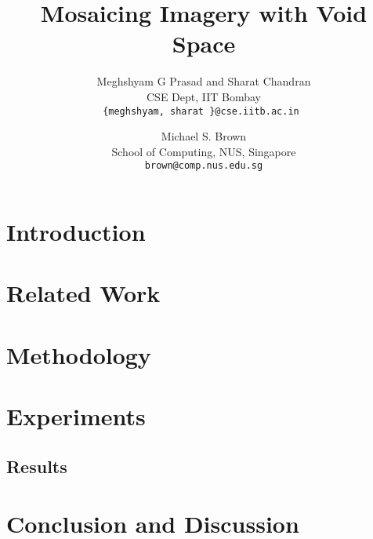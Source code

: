 \documentclass[10pt,twocolumn,letterpaper]{article}
\begin{document}
\title{Mosaicing Imagery with Void Space}

\author{Meghshyam G Prasad and Sharat Chandran\\
CSE Dept, IIT Bombay\\
{\tt\small \{meghshyam, sharat \}@cse.iitb.ac.in }
\and
Michael S. Brown\\
School of Computing, NUS, Singapore\\
{\tt\small brown@comp.nus.edu.sg}
}

\maketitle


\begin{abstract}
   
\end{abstract}

\section{Introduction}


\section{Related Work}

\section{Methodology}

\section{Experiments}

\subsection{Results}

\section{Conclusion and Discussion}
\end{document}
